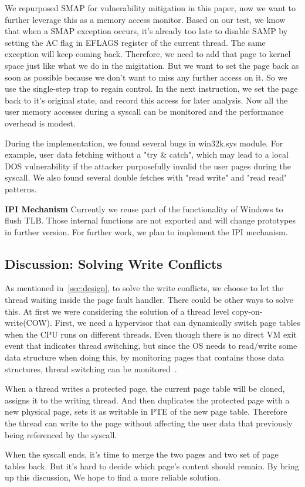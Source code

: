 We repurposed SMAP for vulnerability mitigation in this paper, now we want to further leverage this as a memory access monitor. Based on our test, we know that when a SMAP exception occurs, it's already too late to disable SAMP by setting the AC flag in EFLAGS register of the current thread. The same exception will keep coming back. Therefore, we need to add that page to kernel space just like what we do in the migitation. But we want to set the page back as soon as possible because we don't want to miss any further access on it. So we use the single-step trap to regain control. In the next instruction, we set the page back to it's original state, and record this access for later analysis. Now all the user memory accesses during a syscall can be monitored and the performance overhead is modest.

During the implementation, we found several bugs in win32k.sys module. For example, user data fetching without a "try \& catch", which may lead to a local DOS vulnerability if the attacker purposefully invalid the user pages during the syscall. We also found several double fetches with "read write" and "read read" patterns.

\textbf{IPI Mechanism  }Currently we reuse part of the functionality of Windows to flush TLB. Those internal functions are not exported and will change prototypes in further version. For further work, we plan to implement the IPI mechanism.

\subsection{Discussion: Solving Write Conflicts}

As mentioned in~\autoref{sec:design}, to solve the write conflicts, we choose to let the thread waiting inside the page fault handler. There could be other ways to solve this. At first we were considering the solution of a thread level copy-on-write(COW). First, we need a hypervisor that can dynamically switch page tables when the CPU runs on different threads. Even though there is no direct VM exit event that indicates thread switching, but since the OS needs to read/write some data structure when doing this, by monitoring pages that contains those data structures, thread switching can be monitored~\cite{pan2017digtool}.

When a thread writes a protected page, the current page table will be cloned, assigns it to the writing thread. And then duplicates the protected page with a new physical page, sets it as writable in PTE of the new page table. Therefore the thread can write to the page without affecting the user data that previously being referenced by the syscall.

When the syscall ends, it's time to merge the two pages and two set of page tables back. But it's hard to decide which page's content should remain. By bring up this discussion, We hope to find a more reliable solution. 


